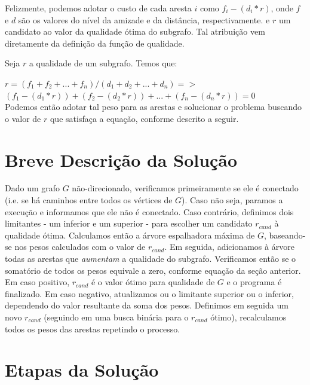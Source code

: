 \documentclass[a4paper,12pt,titlepage]{article}
\begin{document}
Felizmente, podemos adotar o custo de cada aresta $i$ como $f_i - (d_i * r)$, onde $f$ e $d$ são os valores do nível da amizade e da distância, respectivamente. e $r$ um candidato ao valor da qualidade ótima do subgrafo. Tal atribuição vem diretamente da definição da função de qualidade.

Seja $r$ a qualidade de um subgrafo. Temos que:

$ r = (f_1 + f_2 + ... + f_n)  /  (d_1 + d_2 + ... + d_n) => $
\ \\  

$ (f_1 - (d_1 * r)) + (f_2 - (d_2 * r)) + ... + (f_n - (d_n * r)) = 0 $
\ \\ 

Podemos então adotar tal peso para as arestas e solucionar o problema buscando o valor de $r$ que satisfaça a equação, conforme descrito a seguir.

\section{Breve Descrição da Solução}

Dado um grafo $G$ não-direcionado, verificamos primeiramente se ele é conectado (i.e. se há caminhos entre todos os vértices de $G$). Caso não seja, paramos a execução e informamos que ele não é conectado. Caso contrário, definimos dois limitantes - um inferior e um superior - para escolher um candidato $r_{cand}$ à qualidade ótima. Calculamos então a árvore espalhadora máxima de $G$, baseando-se nos pesos calculados com o valor de $r_{cand}$. Em seguida, adicionamos à árvore todas as arestas que \textit{aumentam} a qualidade do subgrafo. Verificamos então se o somatório de todos os pesos equivale a zero, conforme equação da seção anterior. Em caso positivo, $r_{cand}$ é o valor ótimo para qualidade de $G$ e o programa é finalizado. Em caso negativo, atualizamos ou o limitante superior ou o inferior, dependendo do valor resultante da soma dos pesos. Definimos em seguida um novo $r_{cand}$ (seguindo em uma busca binária para o $r_{cand}$ ótimo), recalculamos todos os pesos das arestas repetindo o processo.

\section{Etapas da Solução}
\end{document}
